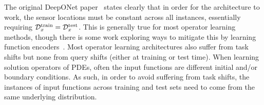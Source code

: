 The original DeepONet paper~\citep{lu2019deeponet} states clearly that in order for the architecture to work, the sensor locations must be constant across all instances, essentially requiring $\mathcal{D}_{x}^{\text{train}} = \mathcal{D}_{x}^{\text{test}}$. This is generally true for most operator learning methods, though there is some work exploring ways to mitigate this by learning function encoders~\citep{ingebrand2025basis, zhang2023belnet}. Most operator learning architectures also suffer from task shifts but none from query shifts (either at training or test time). When learning solution operators of PDEs, often the input functions are different initial and/or boundary conditions. As such, in order to avoid suffering from task shifts, the instances of input functions across training and test sets need to come from the same underlying distribution.
\pagebreak
